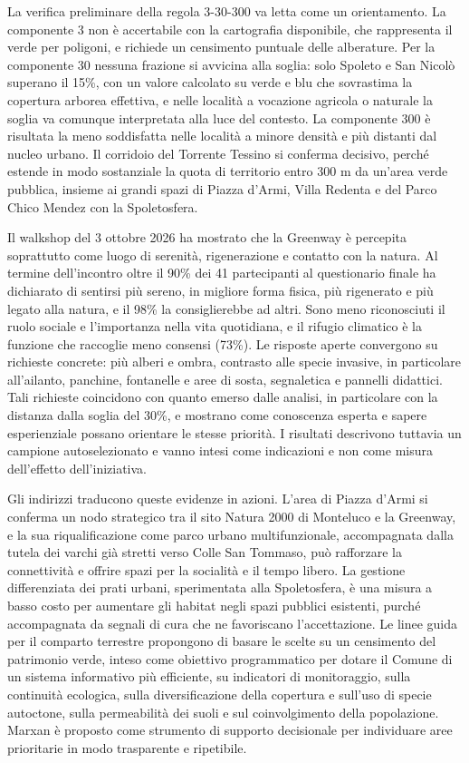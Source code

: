 \documentclass[
  a4paper,
]{book}
\begin{document}
La verifica preliminare della regola 3-30-300 va letta come un orientamento. La componente 3 non è accertabile con la cartografia disponibile, che rappresenta il verde per poligoni, e richiede un censimento puntuale delle alberature. Per la componente 30 nessuna frazione si avvicina alla soglia: solo Spoleto e San Nicolò superano il 15\%, con un valore calcolato su verde e blu che sovrastima la copertura arborea effettiva, e nelle località a vocazione agricola o naturale la soglia va comunque interpretata alla luce del contesto. La componente 300 è risultata la meno soddisfatta nelle località a minore densità e più distanti dal nucleo urbano. Il corridoio del Torrente Tessino si conferma decisivo, perché estende in modo sostanziale la quota di territorio entro 300 m da un'area verde pubblica, insieme ai grandi spazi di Piazza d'Armi, Villa Redenta e del Parco Chico Mendez con la Spoletosfera.

Il walkshop del 3 ottobre 2026 ha mostrato che la Greenway è percepita soprattutto come luogo di serenità, rigenerazione e contatto con la natura. Al termine dell'incontro oltre il 90\% dei 41 partecipanti al questionario finale ha dichiarato di sentirsi più sereno, in migliore forma fisica, più rigenerato e più legato alla natura, e il 98\% la consiglierebbe ad altri. Sono meno riconosciuti il ruolo sociale e l'importanza nella vita quotidiana, e il rifugio climatico è la funzione che raccoglie meno consensi (73\%). Le risposte aperte convergono su richieste concrete: più alberi e ombra, contrasto alle specie invasive, in particolare all'ailanto, panchine, fontanelle e aree di sosta, segnaletica e pannelli didattici. Tali richieste coincidono con quanto emerso dalle analisi, in particolare con la distanza dalla soglia del 30\%, e mostrano come conoscenza esperta e sapere esperienziale possano orientare le stesse priorità. I risultati descrivono tuttavia un campione autoselezionato e vanno intesi come indicazioni e non come misura dell'effetto dell'iniziativa.

Gli indirizzi traducono queste evidenze in azioni. L'area di Piazza d'Armi si conferma un nodo strategico tra il sito Natura 2000 di Monteluco e la Greenway, e la sua riqualificazione come parco urbano multifunzionale, accompagnata dalla tutela dei varchi già stretti verso Colle San Tommaso, può rafforzare la connettività e offrire spazi per la socialità e il tempo libero. La gestione differenziata dei prati urbani, sperimentata alla Spoletosfera, è una misura a basso costo per aumentare gli habitat negli spazi pubblici esistenti, purché accompagnata da segnali di cura che ne favoriscano l'accettazione. Le linee guida per il comparto terrestre propongono di basare le scelte su un censimento del patrimonio verde, inteso come obiettivo programmatico per dotare il Comune di un sistema informativo più efficiente, su indicatori di monitoraggio, sulla continuità ecologica, sulla diversificazione della copertura e sull'uso di specie autoctone, sulla permeabilità dei suoli e sul coinvolgimento della popolazione. Marxan è proposto come strumento di supporto decisionale per individuare aree prioritarie in modo trasparente e ripetibile.
\end{document}
